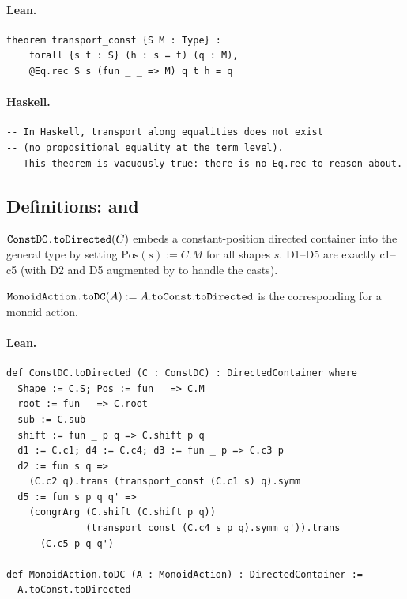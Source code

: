 \documentclass[11pt,a4paper]{article}
\begin{document}
\paragraph{Lean.}
\begin{lstlisting}[style=lean]
theorem transport_const {S M : Type} :
    forall {s t : S} (h : s = t) (q : M),
    @Eq.rec S s (fun _ _ => M) q t h = q
\end{lstlisting}

\paragraph{Haskell.}
\begin{lstlisting}[style=haskell]
-- In Haskell, transport along equalities does not exist
-- (no propositional equality at the term level).
-- This theorem is vacuously true: there is no Eq.rec to reason about.
\end{lstlisting}


\subsection{Definitions:  and }

\begin{defn}
$\texttt{ConstDC.toDirected}(C)$ embeds a constant-position directed container
into the general  type by setting $\mathrm{Pos}(s) :=
C.M$ for all shapes $s$.  D1--D5 are exactly c1--c5 (with D2 and D5
augmented by  to handle the casts).

$\texttt{MonoidAction.toDC}(A) := A.\texttt{toConst}.\texttt{toDirected}$ is the
corresponding  for a monoid action.
\end{defn}

\paragraph{Lean.}
\begin{lstlisting}[style=lean]
def ConstDC.toDirected (C : ConstDC) : DirectedContainer where
  Shape := C.S; Pos := fun _ => C.M
  root := fun _ => C.root
  sub := C.sub
  shift := fun _ p q => C.shift p q
  d1 := C.c1; d4 := C.c4; d3 := fun _ p => C.c3 p
  d2 := fun s q =>
    (C.c2 q).trans (transport_const (C.c1 s) q).symm
  d5 := fun s p q q' =>
    (congrArg (C.shift (C.shift p q))
              (transport_const (C.c4 s p q).symm q')).trans
      (C.c5 p q q')

def MonoidAction.toDC (A : MonoidAction) : DirectedContainer :=
  A.toConst.toDirected
\end{lstlisting}
\end{document}
